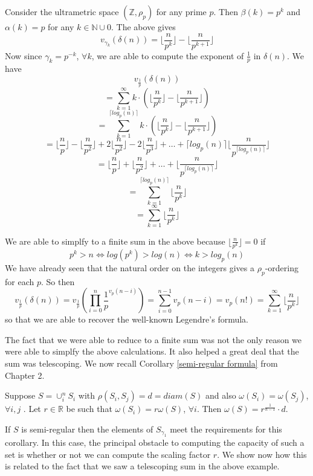 \begin{example}
Consider the ultrametric space $(\mathbb{Z}, \rho_p)$  for any prime $p$. Then $\beta(k)=p^k$ and $\alpha(k)=p$ for any $k \in \mathbb{N} \cup 0$. The above gives 
\[v_{\gamma_k}(\delta(n)) =\lfloor \frac{n}{p^{k}}\rfloor - \lfloor \frac{n}{p^{k+1}} \rfloor\]
Now since $\gamma_k = p^{-k}$, $\forall k$, we are able to compute the exponent of $\frac{1}{p}$ in $\delta(n)$. We have 
\[v_{\frac{1}{p}}(\delta(n)) \]
\[ = \sum_{k=1}^{\infty} k \cdot (\lfloor \frac{n}{p^{k}}\rfloor - \lfloor \frac{n}{p^{k+1}} \rfloor) \]
\[ = \sum_{k=1}^{\lceil log_p(n) \rceil}  k \cdot (\lfloor \frac{n}{p^{k}}\rfloor - \lfloor \frac{n}{p^{k+1}} \rfloor)\]
\[ = \lfloor \frac{n}{p}\rfloor - \lfloor \frac{n}{p^{2}} \rfloor +  2\lfloor \frac{n}{p^2}\rfloor - 2\lfloor \frac{n}{p^3} \rfloor + \ldots +  \lceil log_p(n)\rceil \lfloor \frac{n}{p^{ \lceil log_p(n)\rceil}} \rfloor \]
\[ = \lfloor \frac{n}{p}\rfloor + \lfloor \frac{n}{p^2}\rfloor  + \ldots +  \lfloor \frac{n}{p^{ \lceil log_p(n)\rceil}} \rfloor \]
\[ =  \sum_{k=1}^{\lceil log_p(n) \rceil} \lfloor \frac{n}{p^{k}}\rfloor \]
\[ =  \sum_{k=1}^{\infty} \lfloor \frac{n}{p^{k}}\rfloor \]

We are able to simplfy to a finite sum in the above because $\lfloor \frac{n}{p^k} \rfloor = 0$ if \[ p^k > n \iff log(p^k) > log(n) \iff k > log_p(n)\]
We have already seen that the natural order on the integers gives a $\rho_p$-ordering for each $p$. So then \[v_{\frac{1}{p}}(\delta(n)) = v_{\frac{1}{p}}(\prod_{i=0}^n \frac{1}{p}^{v_p(n-i)}) = \sum_{i=0}^{n-1} v_p(n-i)= v_{p}(n!)  =  \sum_{k=1}^{\infty} \lfloor \frac{n}{p^{k}}\rfloor \]
so that we are able to recover the well-known Legendre's formula.
\end{example}

The fact that we were able to reduce to a finite sum was not the only reason we were able to simplfy the above calculations. It also helped a great deal that the sum was telescoping. We now recall Corollary \ref{semi-regular formula} from Chapter 2.\\


\begin{corollary*}
	Suppose $S = \cup_i^n S_i$ with $\rho(S_i, S_j)=d=diam(S)$ and also $\omega(S_i)=\omega(S_j)$, $\forall i,j$ .  Let $r \in \mathbb{R}$ be such that $\omega(S_i)=r\omega(S)$, $\forall i$. Then $\omega(S) = r^{\frac{1}{n-1}}\cdot d$. 
\end{corollary*}

If $S$ is semi-regular then the elements of $S_{\gamma_1}$ meet the requirements for this corollary. In this case, the principal obstacle to computing the capacity of such a set is whether or not we can compute the scaling factor $r$. We show now how this is related to the fact that we saw a telescoping sum in the above example.

